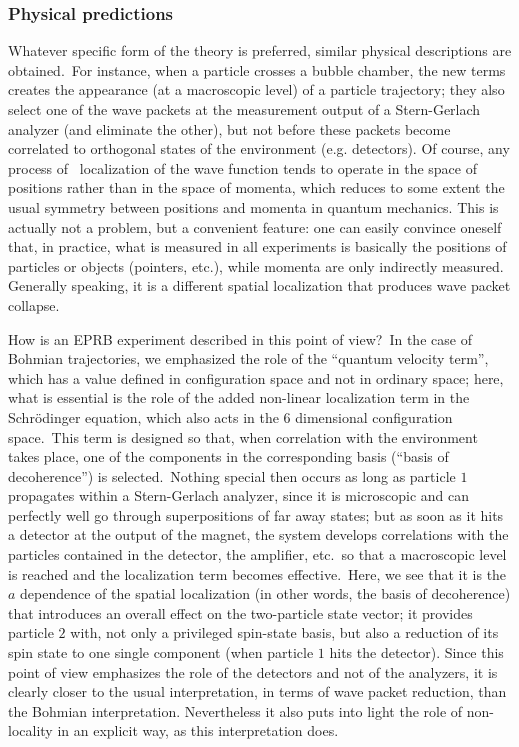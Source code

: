 \documentclass[12pt,onecolumn]{article}%
\begin{document}
\subsubsection{Physical predictions}

Whatever specific form of the theory is preferred, similar physical
descriptions are obtained.\ For instance, when a particle crosses a bubble
chamber, the new terms creates the appearance (at a macroscopic level) of a
particle trajectory; they also select one of the wave packets at the
measurement output of a Stern-Gerlach analyzer (and eliminate the other), but
not before these packets become correlated to orthogonal states of the
environment (e.g. detectors). Of course, any process of \ localization of the
wave function tends to operate in the space of positions rather than in the
space of momenta, which reduces to some extent the usual symmetry between
positions and momenta in quantum mechanics. This is actually not a problem,
but a convenient feature: one can easily convince oneself that, in practice,
what is measured in all experiments is basically the positions of particles or
objects (pointers, etc.), while momenta are only indirectly measured.
Generally speaking, it is a different spatial localization that produces wave
packet collapse.

How is an EPRB experiment described in this point of view?\ In the case of
Bohmian trajectories, we emphasized the role of the ``quantum velocity term'',
which has a value defined in configuration space and not in ordinary space;
here, what is essential is the role of the added non-linear localization term
in the Schr\"{o}dinger equation, which also acts in the 6 dimensional
configuration space.\ This term is designed so that, when correlation with the
environment takes place, one of the components in the corresponding basis
(``basis of decoherence'') is selected.\ Nothing special then occurs as long
as particle $1$ propagates within a Stern-Gerlach analyzer, since it is
microscopic and can perfectly well go through superpositions of far away
states; but as soon as it hits a detector at the output of the magnet, the
system develops correlations with the particles contained in the detector, the
amplifier, etc.\ so that a macroscopic level is reached and the localization
term becomes effective.\ Here, we see that it is the $a$ dependence of the
spatial localization (in other words, the basis of decoherence) that
introduces an overall effect on the two-particle state vector; it provides
particle $2$ with, not only a privileged spin-state basis, but also a
reduction of its spin state to one single component (when particle $1$ hits
the detector). Since this point of view emphasizes the role of the detectors
and not of the analyzers, it is clearly closer to the usual interpretation, in
terms of wave packet reduction, than the Bohmian interpretation. Nevertheless
it also puts into light the role of non-locality in an explicit way, as this
interpretation does.
\end{document}
